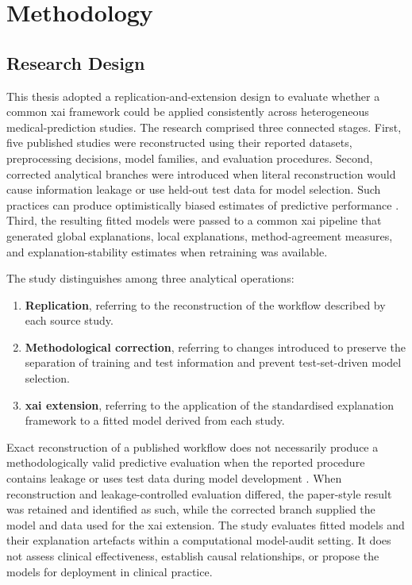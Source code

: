 \chapter{Methodology}
\label{chap:methodology}

\section{Research Design}

This thesis adopted a replication-and-extension design to evaluate whether a common \gls{xai} framework could be applied consistently across heterogeneous medical-prediction studies. The research comprised three connected stages. First, five published studies were reconstructed using their reported datasets, preprocessing decisions, model families, and evaluation procedures. Second, corrected analytical branches were introduced when literal reconstruction would cause information leakage or use held-out test data for model selection. Such practices can produce optimistically biased estimates of predictive performance \citep{collins_tripodai_2024, moons_probastai_2025}. Third, the resulting fitted models were passed to a common \gls{xai} pipeline that generated global explanations, local explanations, method-agreement measures, and explanation-stability estimates when retraining was available.

The study distinguishes among three analytical operations:

\begin{enumerate}
    \item \textbf{Replication}, referring to the reconstruction of the workflow described by each source study.
    \item \textbf{Methodological correction}, referring to changes introduced to preserve the separation of training and test information and prevent test-set-driven model selection.
    \item \textbf{\gls{xai} extension}, referring to the application of the standardised explanation framework to a fitted model derived from each study.
\end{enumerate}

Exact reconstruction of a published workflow does not necessarily produce a methodologically valid predictive evaluation when the reported procedure contains leakage or uses test data during model development \citep{collins_tripodai_2024, moons_probastai_2025}. When reconstruction and leakage-controlled evaluation differed, the paper-style result was retained and identified as such, while the corrected branch supplied the model and data used for the \gls{xai} extension. The study evaluates fitted models and their explanation artefacts within a computational model-audit setting. It does not assess clinical effectiveness, establish causal relationships, or propose the models for deployment in clinical practice.

